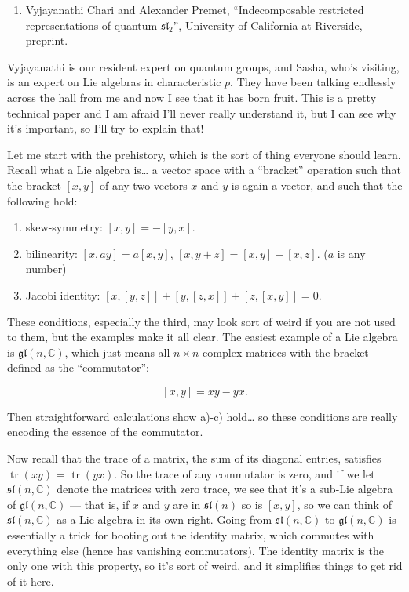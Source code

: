 \documentclass{article}
\def\tightlist{}
\begin{document}
\begin{enumerate}
\def\labelenumi{\arabic{enumi})}
\tightlist
\item
  Vyjayanathi Chari and Alexander Premet, ``Indecomposable restricted
  representations of quantum \(\mathfrak{sl}_2\)'', University of
  California at Riverside, preprint.
\end{enumerate}

Vyjayanathi is our resident expert on quantum groups, and Sasha, who's
visiting, is an expert on Lie algebras in characteristic \(p\). They
have been talking endlessly across the hall from me and now I see that
it has born fruit. This is a pretty technical paper and I am afraid I'll
never really understand it, but I can see why it's important, so I'll
try to explain that!

Let me start with the prehistory, which is the sort of thing everyone
should learn. Recall what a Lie algebra is\ldots{} a vector space with a
``bracket'' operation such that the bracket \([x,y]\) of any two vectors
\(x\) and \(y\) is again a vector, and such that the following hold:

\begin{enumerate}
\def\labelenumi{\alph{enumi})}
\tightlist
\item
  skew-symmetry: \([x,y] = -[y,x]\).
\item
  bilinearity: \([x,ay] = a[x,y]\), \([x,y+z] = [x,y] + [x,z]\). (\(a\)
  is any number)
\item
  Jacobi identity: \([x,[y,z]] + [y,[z,x]] + [z,[x,y]] = 0\).
\end{enumerate}

These conditions, especially the third, may look sort of weird if you
are not used to them, but the examples make it all clear. The easiest
example of a Lie algebra is \(\mathfrak{gl}(n,\mathbb{C})\), which just
means all \(n\times n\) complex matrices with the bracket defined as the
``commutator'':

\[[x,y] = xy - yx.\]

Then straightforward calculations show a)-c) hold\ldots{} so these
conditions are really encoding the essence of the commutator.

Now recall that the trace of a matrix, the sum of its diagonal entries,
satisfies \(\operatorname{tr}(xy)\) = \(\operatorname{tr}(yx)\). So the
trace of any commutator is zero, and if we let
\(\mathfrak{sl}(n,\mathbb{C})\) denote the matrices with zero trace, we
see that it's a sub-Lie algebra of \(\mathfrak{gl}(n,\mathbb{C})\) ---
that is, if \(x\) and \(y\) are in \(\mathfrak{sl}(n)\) so is \([x,y]\),
so we can think of \(\mathfrak{sl}(n,\mathbb{C})\) as a Lie algebra in
its own right. Going from \(\mathfrak{sl}(n,\mathbb{C})\) to
\(\mathfrak{gl}(n,\mathbb{C})\) is essentially a trick for booting out
the identity matrix, which commutes with everything else (hence has
vanishing commutators). The identity matrix is the only one with this
property, so it's sort of weird, and it simplifies things to get rid of
it here.
\end{document}
